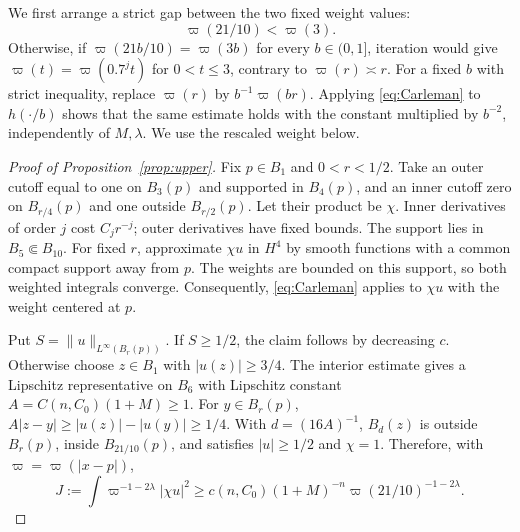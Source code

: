 \documentclass[11pt,twoside,leqno]{article}
\numberwithin{equation}{section}
\theoremstyle{definition}
\theoremstyle{remark}
\begin{document}
We first arrange a strict gap between the two fixed weight values:
\begin{equation}\label{eq:weight-gap}
 \varpi(21/10)<\varpi(3).
\end{equation}
Otherwise, if $\varpi(21b/10)=\varpi(3b)$ for every $b\in(0,1]$,
iteration would give $\varpi(t)=\varpi(0.7^jt)$ for $0<t\le3$,
contrary to $\varpi(r)\asymp r$. For a fixed $b$ with strict inequality,
replace $\varpi(r)$ by $b^{-1}\varpi(br)$. Applying
\eqref{eq:Carleman} to $h(\cdot/b)$ shows that the same estimate
holds with the constant multiplied by $b^{-2}$, independently of
$M,\lambda$. We use the rescaled weight below.

\begin{proof}[Proof of Proposition~\ref{prop:upper}]
Fix $p\in B_1$ and $0<r<1/2$. Take an outer cutoff equal to one
on $B_3(p)$ and supported in $B_4(p)$, and an inner cutoff zero
on $B_{r/4}(p)$ and one outside $B_{r/2}(p)$. Let their product be
$\chi$. Inner derivatives of order $j$ cost $C_jr^{-j}$; outer
derivatives have fixed bounds. The support lies in $B_5\Subset B_{10}$.
For fixed $r$, approximate $\chi u$ in $H^4$ by smooth functions with
a common compact support away from $p$. The weights are bounded on
this support, so both weighted integrals converge. Consequently,
\eqref{eq:Carleman} applies to $\chi u$ with the weight centered at $p$.

Put $S=\|u\|_{L^\infty(B_r(p))}$. If $S\ge1/2$, the claim follows
by decreasing $c$. Otherwise choose $z\in B_1$ with $|u(z)|\ge3/4$.
The interior estimate gives a Lipschitz representative on $B_6$ with
Lipschitz constant $A=C(n,C_0)(1+M)\ge1$. For $y\in B_r(p)$,
$A|z-y|\ge|u(z)|-|u(y)|\ge1/4$. With $d=(16A)^{-1}$,
$B_d(z)$ is outside $B_r(p)$, inside $B_{21/10}(p)$, and satisfies
$|u|\ge1/2$ and $\chi=1$. Therefore, with $\varpi=\varpi(|x-p|)$,
\begin{equation}\label{eq:J-bound}
 J:=\int\varpi^{-1-2\lambda}|\chi u|^2
 \ge c(n,C_0)(1+M)^{-n}\varpi(21/10)^{-1-2\lambda}.
\end{equation}


\end{proof}
\end{document}
